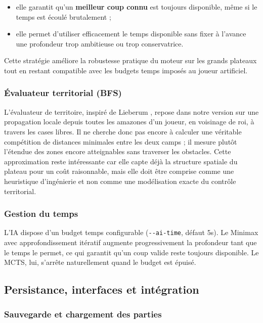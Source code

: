 \documentclass[a4paper]{article}
\begin{document}
\begin{itemize}
    \item elle garantit qu'un \textbf{meilleur coup connu} est toujours disponible, même si le temps est écoulé brutalement ;
    \item elle permet d'utiliser efficacement le temps disponible sans fixer à l'avance une profondeur trop ambitieuse ou trop conservatrice.
\end{itemize}

Cette stratégie améliore la robustesse pratique du moteur sur les grands plateaux tout en restant compatible avec les budgets temps imposés au joueur artificiel.

\subsubsection{Évaluateur territorial (BFS)}

L'évaluateur de territoire, inspiré de Lieberum \cite{lieberum1999}, repose dans notre version sur une propagation locale depuis toutes les amazones d'un joueur, en voisinage de roi, à travers les cases libres. Il ne cherche donc pas encore à calculer une véritable compétition de distances minimales entre les deux camps ; il mesure plutôt l'étendue des zones encore atteignables sans traverser les obstacles. Cette approximation reste intéressante car elle capte déjà la structure spatiale du plateau pour un coût raisonnable, mais elle doit être comprise comme une heuristique d'ingénierie et non comme une modélisation exacte du contrôle territorial.

\subsubsection{Gestion du temps}

L'IA dispose d'un budget temps configurable (\texttt{-{}-ai-time}, défaut 5s). Le Minimax avec approfondissement itératif augmente progressivement la profondeur tant que le temps le permet, ce qui garantit qu'un coup valide reste toujours disponible. Le MCTS, lui, s'arrête naturellement quand le budget est épuisé.


\subsection{Persistance, interfaces et intégration}

\subsubsection{Sauvegarde et chargement des parties}
\end{document}
